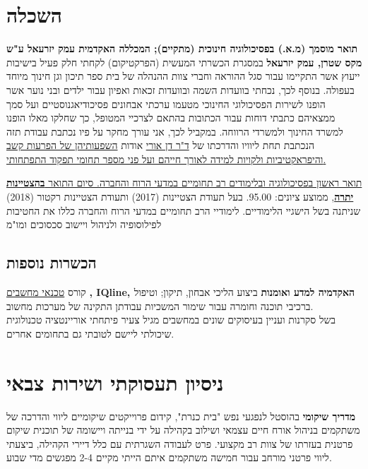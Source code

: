 \section{השכלה}

{\textbf{תואר מוסמך (מ.א.) בפסיכולוגיה חינוכית (מתקיים); המכללה האקדמית עמק יזרעאל ע"ש מקס שטרן, עמק יזרעאל}}
{במסגרת הכשרתי המעשית (הפרקטיקום) לקחתי חלק פעיל בישיבות ייעוץ אשר התקיימו עבור סגל ההוראה וחברי צוות ההנהלה של בית ספר תיכון וגן חינוך מיוחד בעפולה. בנוסף לכך, נכחתי בוועדות השמה ובוועדות זכאות ואפיון עבור ילדים ובני נוער אשר הופנו לשירות הפסיכולוגי החינוכי מטעמו  ערכתי אבחונים פסיכודיאגנוסטיים ועל סמך ממצאיהם כתבתי דוחות עבור הכתובות בהתאם לצרכיי המטופל, כך שחלקו מאלו הופנו למשרד החינוך ולמשרדי הרווחה. 
	במקביל לכך, אני עורך מחקר על פיו נכתבת עבודת תזה הנכתבת תחת ליוויו והדרכתו של 
	\href{https://www.researchgate.net/scientific-contributions/Orrie-Dan-2172412162}{ד"ר דן אורי} אודות 
	\href{https://tinyurl.com/ADHD-Coping-Seminar}{השפעותיהן של הפרעות קשב והיפראקטיביות ולקויות למידה לאורך חייהם ועל פני מספר תחומי תפקוד התפתחותי.}}
{}

{\href{https://www.dropbox.com/s/pcm0mybvgi85ma0/BA-Psych.pdf}{תואר ראשון בפסיכולוגיה ובלימודים רב תחומיים במדעי הרוח והחברה. סיום התואר \textbf{בהצטיינות יתרה}}, ממוצע ציונים: 95.00.}
{בעל תעודת הצטיינות (2017) ותעודת הצטיינות רקטור (2018) שניתנה בשל הישגיי הלימודיים.}
{לימודיי הרב תחומיים במדעי הרוח והחברה כללו את החטיבות לפילוסופיה ולניהול ויישוב סכסוכים ומו"מ}

\subsection{הכשרות נוספות}
 {קורס
\href{https://www.dropbox.com/s/csphxdynjdg3ze2/computer-technitian-certificate.jpg}{טכנאי מחשבים}
		\textbf{, IQline, האקדמיה למדע ואומנות}}
{ביצוע הליכי אבחון, תיקון; וטיפול ברכיבי תוכנה וחומרה עבור שימור המשכיות עבודתן התקינה של מערכות מחשוב. \\
בשל סקרנות ועניין בעיסוקים שונים במחשבים מגיל צעיר פיתחתי אוריינטציה טכנולוגית שיכולתי ליישם לטובתי גם בתחומים אחרים.}
{}
{}

\section{ניסיון תעסוקתי ושירות צבאי}

{\textbf{מדריך שיקומי}  בהוסטל לנפגעי נפש "בית כנרת", קידום פרוייקטים שיקומיים}
{ליווי והדרכה של משתקמים בניהול אורח חיים עצמאי ושילוב בקהילה על ידי בנייתה ויישומה של תוכנית שיקום פרטנית בעזרתו של צוות רב מקצועי. פרט לעבודה השגרתית עם כלל דיירי הקהילה, ביצעתי ליווי פרטני מורחב עבור חמישה משתקמים איתם הייתי מקיים 2-4 מפגשים מדי שבוע.}
{}

